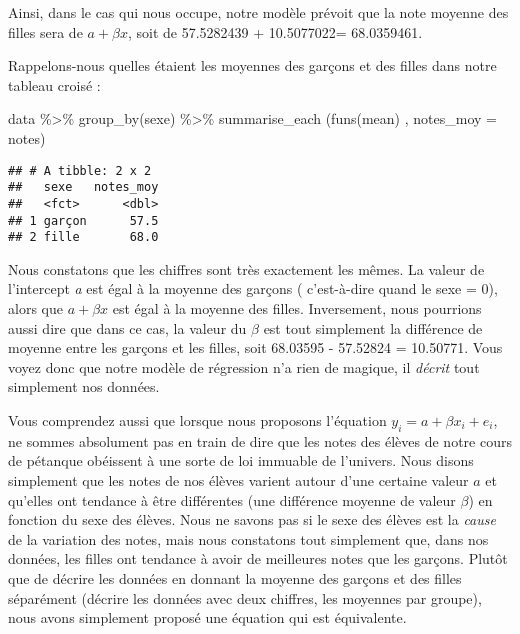 \documentclass[
]{book}
\newenvironment{Shaded}{\begin{snugshade}}{\end{snugshade}}
\newcommand{\AttributeTok}[1]{\textcolor[rgb]{0.77,0.63,0.00}{#1}}
\newcommand{\FunctionTok}[1]{\textcolor[rgb]{0.00,0.00,0.00}{#1}}
\newcommand{\NormalTok}[1]{#1}
\newcommand{\SpecialCharTok}[1]{\textcolor[rgb]{0.00,0.00,0.00}{#1}}
\begin{document}
Ainsi, dans le cas qui nous occupe, notre modèle prévoit que la note moyenne des filles sera de \(a+\beta x\), soit de 57.5282439 + 10.5077022= 68.0359461.

Rappelons-nous quelles étaient les moyennes des garçons et des filles dans notre tableau croisé :

\begin{Shaded}
\begin{Highlighting}[]
\NormalTok{data }\SpecialCharTok{\%\textgreater{}\%} 
  \FunctionTok{group\_by}\NormalTok{(sexe) }\SpecialCharTok{\%\textgreater{}\%} 
  \FunctionTok{summarise\_each}\NormalTok{ (}\FunctionTok{funs}\NormalTok{(mean) , }\AttributeTok{notes\_moy =}\NormalTok{ notes)}
\end{Highlighting}
\end{Shaded}

\begin{verbatim}
## # A tibble: 2 x 2
##   sexe   notes_moy
##   <fct>      <dbl>
## 1 garçon      57.5
## 2 fille       68.0
\end{verbatim}

Nous constatons que les chiffres sont très exactement les mêmes. La valeur de l'intercept \emph{a} est égal à la moyenne des garçons ( c'est-à-dire quand le sexe = 0), alors que \(a+\beta x\) est égal à la moyenne des filles. Inversement, nous pourrions aussi dire que dans ce cas, la valeur du \(\beta\) est tout simplement la différence de moyenne entre les garçons et les filles, soit 68.03595 - 57.52824 = 10.50771. Vous voyez donc que notre modèle de régression n'a rien de magique, il \emph{décrit} tout simplement nos données.

Vous comprendez aussi que lorsque nous proposons l'équation \(y_i=a+\beta x_i + e_i\), ne sommes absolument pas en train de dire que les notes des élèves de notre cours de pétanque obéissent à une sorte de loi immuable de l'univers. Nous disons simplement que les notes de nos élèves varient autour d'une certaine valeur \(a\) et qu'elles ont tendance à être différentes (une différence moyenne de valeur \(\beta\)) en fonction du sexe des élèves. Nous ne savons pas si le sexe des élèves est la \emph{cause} de la variation des notes, mais nous constatons tout simplement que, dans nos données, les filles ont tendance à avoir de meilleures notes que les garçons. Plutôt que de décrire les données en donnant la moyenne des garçons et des filles séparément (décrire les données avec deux chiffres, les moyennes par groupe), nous avons simplement proposé une équation qui est équivalente.
\end{document}
